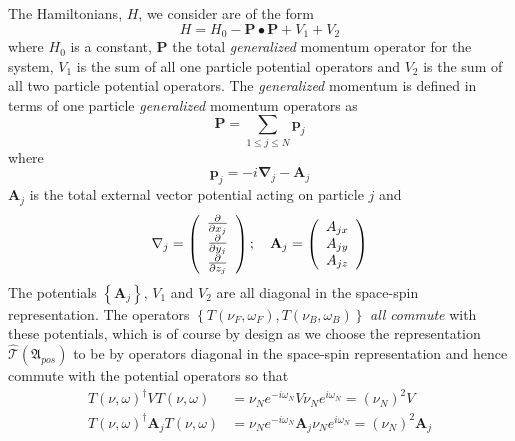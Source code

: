 \documentclass[aps,preprint]{revtex4}%
\begin{document}
The Hamiltonians, $H$, we consider are of the form%
\begin{equation}
H=H_{0}-\mathbf{P\bullet P}+V_{1}+V_{2}%
\end{equation}
where $H_{0}$ is a constant, $\mathbf{P}$ the total \emph{generalized
}momentum operator for the system, $V_{1}$ is the sum of all one particle
potential operators and $V_{2}$ is the sum of all two particle potential
operators. The \emph{generalized }momentum is defined in terms of one particle
\emph{generalized }momentum operators as
\begin{equation}
\mathbf{P=}%
{\displaystyle\sum\limits_{1\leq j\leq N}}
\mathbf{p}_{j}%
\end{equation}
where
\begin{equation}
\mathbf{p}_{j}=-i\mathbf{\nabla}_{j}-\mathbf{A}_{j}%
\end{equation}
$\mathbf{A}_{j}$ is the total external vector potential acting on particle $j$
and
\begin{equation}
\mathbf{\nabla}_{j}=\left(
\begin{array}
[c]{c}%
\frac{\partial}{\partial x_{j}}\\
\frac{\partial}{\partial y_{j}}\\
\frac{\partial}{\partial z_{j}}%
\end{array}
\right)  ;\quad\mathbf{A}_{j}=\left(
\begin{array}
[c]{c}%
A_{jx}\\
A_{jy}\\
A_{jz}%
\end{array}
\right)
\end{equation}
The potentials $\left\{  \mathbf{A}_{j}\right\}  $, $V_{1}$ and $V_{2}$ are
all diagonal in the space-spin representation. The operators $\left\{
T\left(  \nu_{F},\omega_{F}\right)  ,T\left(  \nu_{B},\omega_{B}\right)
\right\}  $ \emph{all} \emph{commute }with these potentials, which is of
course by design as we choose the representation $\mathcal{\hat{T}}\left(
\mathfrak{A}_{pos}\right)  $ to be by operators diagonal in the space-spin
representation and hence commute with the potential operators so that
\begin{align}
T\left(  \nu,\omega\right)  ^{\dagger}VT\left(  \nu,\omega\right)   &
=\nu_{N}e^{-i\omega_{N}}V\nu_{N}e^{i\omega_{N}}=\left(  \nu_{N}\right)
^{2}V\nonumber\\
T\left(  \nu,\omega\right)  ^{\dagger}\mathbf{A}_{j}T\left(  \nu
,\omega\right)   &  =\nu_{N}e^{-i\omega_{N}}\mathbf{A}_{j}\nu_{N}%
e^{i\omega_{N}}=\left(  \nu_{N}\right)  ^{2}\mathbf{A}_{j}%
\end{align}
\end{document}

